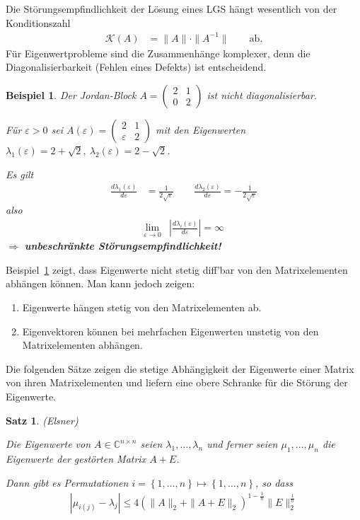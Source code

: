 \documentclass[%
a4paper,
11pt,		%
leqno,		%
]
{scrartcl}
\newcommand{\C}{\mathbb{C}}
\theoremstyle{plain}
\theoremstyle{plain}
\newtheorem{mysatz}[mydef]{Satz}
\theoremstyle{plain}
\theoremstyle{plain}
\newtheorem{mybsp}[mydef]{Beispiel}
\begin{document}
Die Störungsempfindlichkeit der Lösung eines LGS hängt wesentlich von der Konditionszahl
\begin{align*}
  \mathcal{K}(A) & = \|A\| \cdot \|A^{-1}\| \qquad \text{ab.}
\end{align*}
Für Eigenwertprobleme sind die Zusammenhänge komplexer, denn die Diagonalisierbarkeit (Fehlen eines Defekts) ist entscheidend.
\begin{mybsp}\label{bspEWJordanBlock} Der Jordan-Block 
$A = 
\begin{pmatrix}
2 & 1\\
0 & 2
\end{pmatrix}
$
ist nicht diagonalisierbar. 

Für $\varepsilon > 0$ sei
$A(\varepsilon) = 
\begin{pmatrix}
2 & 1\\
\varepsilon & 2
\end{pmatrix}
$
mit den Eigenwerten $\lambda_1(\varepsilon)=2+\sqrt{2},\ \lambda_2(\varepsilon)=2-\sqrt{2}$.

Es gilt
\begin{align*}
\frac{d\lambda_1(\varepsilon)}{d\varepsilon} & = \frac{1}{2\sqrt{\varepsilon}} \qquad \frac{d\lambda_2(\varepsilon)}{d\varepsilon} = -\frac{1}{2\sqrt{\varepsilon}}
\end{align*}
also
\begin{align*}
\lim\limits_{\varepsilon \rightarrow 0} & \left| \frac{d \lambda_i(\varepsilon)}{d \varepsilon} \right| = \infty
\end{align*}
\center $\Rightarrow$ \textbf{unbeschränkte Störungsempfindlichkeit!}
\end{mybsp}

\newpage

Beispiel~\ref{bspEWJordanBlock} zeigt, dass Eigenwerte nicht stetig diff'bar von den Matrixelementen abhängen können. Man kann jedoch zeigen:
\begin{enumerate}
\item Eigenwerte hängen stetig von den Matrixelementen ab.
\item Eigenvektoren können bei mehrfachen Eigenwerten unstetig von den Matrixelementen abhängen.
\end{enumerate}

Die folgenden Sätze zeigen die stetige Abhängigkeit der Eigenwerte einer Matrix von ihren Matrixelementen und liefern eine obere Schranke für die Störung der Eigenwerte.

\begin{mysatz}(Elsner)

Die Eigenwerte von $A \in \C^{n \times n}$ seien $\lambda_1, \dots , \lambda_n$ und ferner seien $\mu_1, \dots , \mu_n$ die Eigenwerte der gestörten Matrix $A+E$.

Dann gibt es Permutationen $i=\left\{ 1,\dots,n \right\} \mapsto \left\{ 1,\dots,n \right\}$, so dass
\begin{align*}
|\mu_{i(j)} - \lambda_j| \leq 4\left( \|A\|_2 + \|A+E\|_2 \right)^{1-\frac{1}{n}} \|E\|_2^{\frac{1}{n}}
\end{align*}
\end{mysatz}
\end{document}
